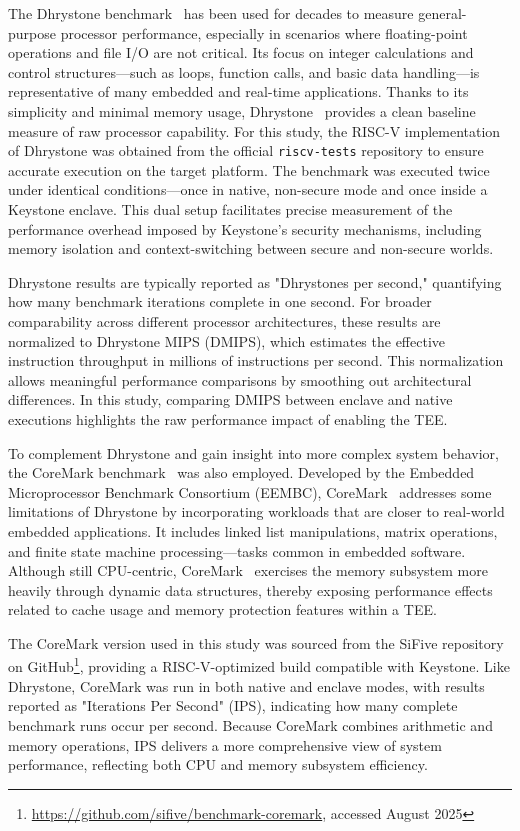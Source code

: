 The Dhrystone benchmark~\cite{weiss2002dhrystone} has been used for decades to measure general-purpose processor performance, especially in scenarios where floating-point operations and file I/O are not critical. Its focus on integer calculations and control structures—such as loops, function calls, and basic data handling—is representative of many embedded and real-time applications. Thanks to its simplicity and minimal memory usage, Dhrystone~\cite{weiss2002dhrystone} provides a clean baseline measure of raw processor capability. For this study, the RISC-V implementation of Dhrystone was obtained from the official \texttt{riscv-tests} repository to ensure accurate execution on the target platform. The benchmark was executed twice under identical conditions—once in native, non-secure mode and once inside a Keystone enclave. This dual setup facilitates precise measurement of the performance overhead imposed by Keystone’s security mechanisms, including memory isolation and context-switching between secure and non-secure worlds.

Dhrystone results are typically reported as "Dhrystones per second," quantifying how many benchmark iterations complete in one second. For broader comparability across different processor architectures, these results are normalized to Dhrystone MIPS (DMIPS), which estimates the effective instruction throughput in millions of instructions per second. This normalization allows meaningful performance comparisons by smoothing out architectural differences. In this study, comparing DMIPS between enclave and native executions highlights the raw performance impact of enabling the TEE.

To complement Dhrystone and gain insight into more complex system behavior, the CoreMark benchmark~\cite{gal2012exploring} was also employed. Developed by the Embedded Microprocessor Benchmark Consortium (EEMBC), CoreMark~\cite{gal2012exploring} addresses some limitations of Dhrystone by incorporating workloads that are closer to real-world embedded applications. It includes linked list manipulations, matrix operations, and finite state machine processing—tasks common in embedded software. Although still CPU-centric, CoreMark~\cite{gal2012exploring} exercises the memory subsystem more heavily through dynamic data structures, thereby exposing performance effects related to cache usage and memory protection features within a TEE.

The CoreMark version used in this study was sourced from the SiFive repository on GitHub\footnote{\url{https://github.com/sifive/benchmark-coremark}, accessed August 2025}, providing a RISC-V-optimized build compatible with Keystone. Like Dhrystone, CoreMark was run in both native and enclave modes, with results reported as "Iterations Per Second" (IPS), indicating how many complete benchmark runs occur per second. Because CoreMark combines arithmetic and memory operations, IPS delivers a more comprehensive view of system performance, reflecting both CPU and memory subsystem efficiency.

